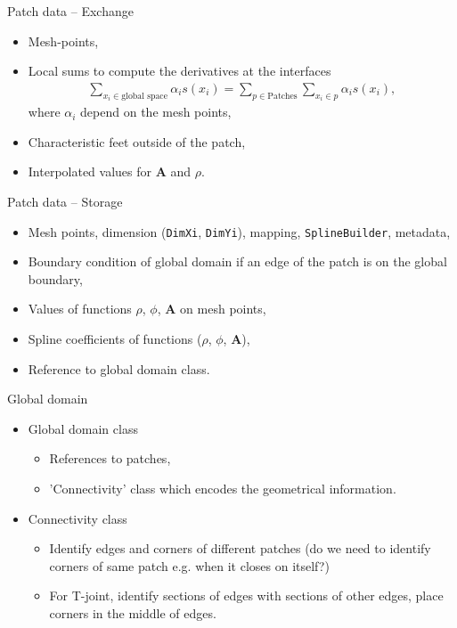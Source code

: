 \documentclass[
	english,%
	logo=false,%
	eurofusion=false, %
	titlegraphic=true, %
	]{ippbeamer}
\begin{document}
\begin{frame}{Patch data -- Exchange}
	\begin{itemize}
		\item Mesh-points,
		\item Local sums to compute the derivatives at the interfaces
				\begin{align*}
					\sum_{x_i \in \text{global space}} \alpha_i s(x_i) = \sum_{p \in\text{Patches}} 
							\sum_{x_i \in p} \alpha_i s(x_i),
				\end{align*}
		where $\alpha_i$ depend on the mesh points,
		\item Characteristic feet outside of the patch,
		\item Interpolated values for $\mathbf{A}$ and $\rho$.
	\end{itemize}
\end{frame}
\begin{frame}{Patch data -- Storage}
	\begin{itemize}
		\item Mesh points, dimension (\texttt{DimXi}, \texttt{DimYi}), mapping,
				\texttt{SplineBuilder}, metadata, 
		\item Boundary condition of global domain if an edge of the patch is on the global boundary,
		\item Values of functions $\rho$, $\phi$, $\mathbf{A}$ on mesh points,
		\item Spline coefficients of functions ($\rho$, $\phi$, $\mathbf{A}$),
		\item Reference to global domain class.
	\end{itemize}
\end{frame}

\begin{frame}{Global domain}
	\begin{itemize}
		\item Global domain class
		\begin{itemize}
			\item References to patches,
			\item 'Connectivity' class which encodes the geometrical information.
		\end{itemize}
		\item Connectivity class
		\begin{itemize}
			\item Identify edges and corners of different patches (do we need to identify
					corners of same patch e.g. when it closes on itself?)
			\item For T-joint, identify sections of edges with sections of other edges, 
					place corners in the middle of edges.
		\end{itemize}
		
	\end{itemize}
	\end{frame}
\end{document}
